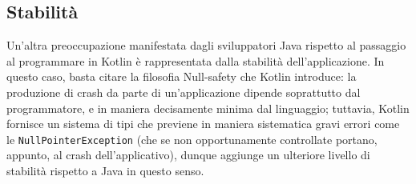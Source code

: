 \subsection{Stabilità}
Un'altra preoccupazione manifestata dagli sviluppatori Java rispetto al passaggio al programmare in Kotlin è rappresentata dalla stabilità dell'applicazione. In questo caso, basta citare la filosofia Null-safety che Kotlin introduce: la produzione di crash da parte di un'applicazione dipende soprattutto dal programmatore, e in maniera decisamente minima dal linguaggio; tuttavia, Kotlin fornisce un sistema di tipi che previene in maniera sistematica gravi errori come le \texttt{NullPointerException} (che se non opportunamente controllate portano, appunto, al crash dell'applicativo), dunque aggiunge un ulteriore livello di stabilità rispetto a Java in questo senso.\\

